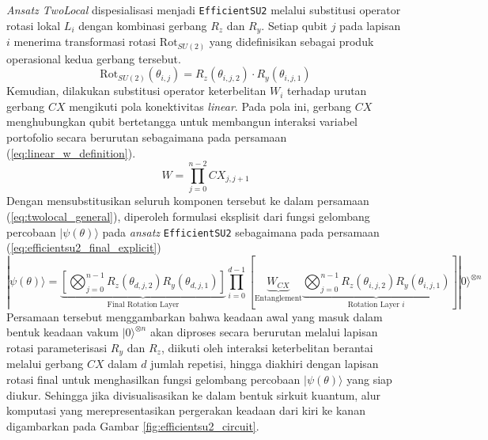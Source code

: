 \textit{Ansatz TwoLocal} dispesialisasi menjadi \texttt{EfficientSU2} melalui substitusi operator rotasi lokal $L_i$ dengan kombinasi gerbang $R_z$ dan $R_y$. Setiap qubit $j$ pada lapisan $i$ menerima transformasi rotasi $\text{Rot}_{SU(2)}$ yang didefinisikan sebagai produk operasional kedua gerbang tersebut.
\begin{equation}
\text{Rot}_{SU(2)}(\theta_{i,j}) = R_z(\theta_{i,j,2}) \cdot R_y(\theta_{i,j,1})
\label{eq:rot_su2_definition}
\end{equation}
Kemudian, dilakukan substitusi operator keterbelitan $W_i$ terhadap urutan gerbang $CX$ mengikuti pola konektivitas \textit{linear}. Pada pola ini, gerbang $CX$ menghubungkan qubit bertetangga untuk membangun interaksi variabel portofolio secara berurutan sebagaimana pada persamaan (\ref{eq:linear_w_definition}).
\begin{equation}
W = \prod_{j=0}^{n-2} CX_{j, j+1}
\label{eq:linear_w_definition}
\end{equation}
Dengan mensubstitusikan seluruh komponen tersebut ke dalam persamaan (\ref{eq:twolocal_general}), diperoleh formulasi eksplisit dari fungsi gelombang percobaan $|\psi(\theta) \rangle$ pada \textit{ansatz} \texttt{EfficientSU2} sebagaimana pada persamaan (\ref{eq:efficientsu2_final_explicit})
\begin{equation}
|\psi(\theta) \rangle = \underbrace{\left[ \bigotimes_{j=0}^{n-1} R_z(\theta_{d,j,2}) R_y(\theta_{d,j,1}) \right]}_{\text{Final Rotation Layer}} \prod_{i=0}^{d-1} \left[ \underbrace{W_{CX}}_{\text{Entanglement}} \underbrace{\bigotimes_{j=0}^{n-1} R_z(\theta_{i,j,2}) R_y(\theta_{i,j,1})}_{\text{Rotation Layer } i} \right] |0 \rangle^{\otimes n}
\label{eq:efficientsu2_final_explicit}
\end{equation}
Persamaan tersebut menggambarkan bahwa keadaan awal yang masuk dalam bentuk keadaan vakum $|0\rangle^{\otimes n}$ akan diproses secara berurutan melalui lapisan rotasi parameterisasi $R_y$ dan $R_z$, diikuti oleh interaksi keterbelitan berantai melalui gerbang $CX$ dalam $d$ jumlah repetisi, hingga diakhiri dengan lapisan rotasi final untuk menghasilkan fungsi gelombang percobaan $|\psi(\theta)\rangle$ yang siap diukur. Sehingga jika divisualisasikan ke dalam bentuk sirkuit kuantum, alur komputasi yang merepresentasikan pergerakan keadaan dari kiri ke kanan digambarkan pada Gambar \ref{fig:efficientsu2_circuit}.

